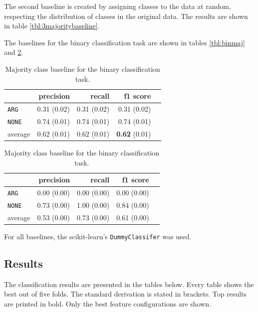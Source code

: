 The second baseline is created by assigning classes to the data at random, respecting the distribution of classes in the original data. The results are shown in table \ref{tbl:3majoritybaseline}.

The baselines for the binary classification task are shown in tables \ref{tbl:binmaj} and \ref{tbl:binstrat}.


\begin{table}[!htb]
    \begin{minipage}{.5\linewidth}
      \caption{Random (stratified) baseline for the binary classification task.}
      \label{tbl:binmaj}
      \centering
      
\begin{tabular}{@{}lrrrr@{}}
\toprule
 	&	 precision &	 recall &	 f1 score  \\ \midrule 
\texttt{ARG}	&	 0.31 \scriptsize{(0.02)} &	 0.31 \scriptsize{(0.02)} &	 0.31 \scriptsize{(0.02)}  \\ 
\texttt{NONE}	&	 0.74 \scriptsize{(0.01)} &	 0.74 \scriptsize{(0.01)} &	 0.74 \scriptsize{(0.01)}  \\ 
average	&	 0.62 \scriptsize{(0.01)} &	 0.62 \scriptsize{(0.01)} &	 \textbf{0.62} \scriptsize{(0.01)}  \\ 
\bottomrule
\end{tabular}

  \end{minipage}%
    \begin{minipage}{.5\linewidth}
      \centering
        \caption{Majority class baseline for the binary classification task.}
        \label{tbl:binstrat}
\begin{tabular}{@{}lrrrr@{}}
\toprule
 	&	 precision &	 recall &	 f1 score  \\ \midrule 
\texttt{ARG}	&	 0.00 \scriptsize{(0.00)} &	 0.00 \scriptsize{(0.00)} &	 0.00 \scriptsize{(0.00)}  \\ 
\texttt{NONE}	&	 0.73 \scriptsize{(0.00)} &	 1.00 \scriptsize{(0.00)} &	 0.84 \scriptsize{(0.00)}  \\ 
average	&	 0.53 \scriptsize{(0.00)} &	 0.73 \scriptsize{(0.00)} &	 0.61 \scriptsize{(0.00)}  \\ 
\bottomrule
\end{tabular}
    \end{minipage} 
\end{table}


For all baselines, the scikit-learn's \texttt{DummyClassifer} was used.


\subsection{Results}
\label{sec:3_results}
The classification results are presented in the tables below. Every table shows the best out of five folds. The standard derivation is stated in brackets. Top results are printed in bold. Only the best feature configurations are shown.

